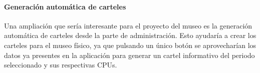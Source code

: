 \paragraph*{Generación automática de carteles}
Una ampliación que sería interesante para el proyecto del museo es la generación automática de carteles desde la parte de administración. Esto ayudaría a crear los carteles para el museo físico, ya que pulsando un único botón se aprovecharían los datos ya presentes en la aplicación para generar un cartel informativo del periodo seleccionado y sus respectivas CPUs.


% 
%
